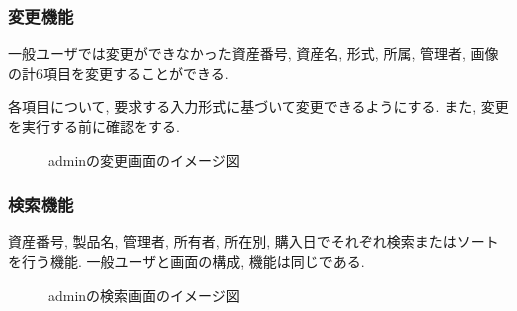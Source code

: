 \documentclass[11ptm]{jsarticle}
\begin{document}
\clearpage
\subsubsection{変更機能}
\label{subsubsec:変更機能(admin)}
一般ユーザでは変更ができなかった資産番号, 資産名, 形式, 所属, 管理者, 画像の計6項目を変更することができる. \par
各項目について, 要求する入力形式に基づいて変更できるようにする. また, 変更を実行する前に確認をする. 
\begin{figure}[h]
  \centering
  \caption{\label{fig:adminの変更画面のイメージ図}adminの変更画面のイメージ図}
\end{figure}

\clearpage
\subsubsection{検索機能}
\label{subsubsec:検索機能(admin)}
資産番号, 製品名, 管理者, 所有者, 所在別, 購入日でそれぞれ検索またはソートを行う機能. 一般ユーザと画面の構成, 機能は同じである.
\begin{figure}[h]
  \centering
  \caption{\label{fig:adminの検索画面のイメージ図}adminの検索画面のイメージ図}
\end{figure}
\end{document}
